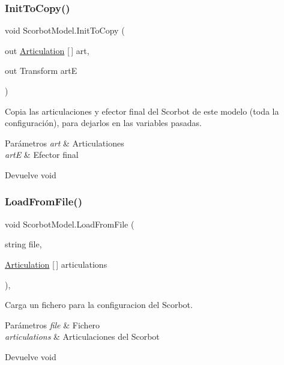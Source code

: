 \subsubsection{\texorpdfstring{InitToCopy()}{InitToCopy()}}
{\footnotesize\ttfamily void Scorbot\+Model.\+Init\+To\+Copy (\begin{DoxyParamCaption}\item[{out \mbox{\hyperlink{class_articulation}{Articulation}} \mbox{[}$\,$\mbox{]}}]{art,  }\item[{out Transform}]{artE }\end{DoxyParamCaption})\hspace{0.3cm}{\ttfamily [inline]}}

Copia las articulaciones y efector final del Scorbot de este modelo (toda la configuración), para dejarlos en las variables pasadas. 
\begin{DoxyParams}{Parámetros}
{\em art} & Articulationes \\
\hline
{\em artE} & Efector final \\
\hline
\end{DoxyParams}
\begin{DoxyReturn}{Devuelve}
void 
\end{DoxyReturn}
\mbox{\label{class_scorbot_model_a35cbb52dd700f099d0f4d66b8516a69b}} 
\subsubsection{\texorpdfstring{LoadFromFile()}{LoadFromFile()}}
{\footnotesize\ttfamily void Scorbot\+Model.\+Load\+From\+File (\begin{DoxyParamCaption}\item[{string}]{file,  }\item[{\mbox{\hyperlink{class_articulation}{Articulation}} \mbox{[}$\,$\mbox{]}}]{articulations }\end{DoxyParamCaption})\hspace{0.3cm}{\ttfamily [inline]}, {\ttfamily [private]}}

Carga un fichero para la configuracion del Scorbot. 
\begin{DoxyParams}{Parámetros}
{\em file} & Fichero \\
\hline
{\em articulations} & Articulaciones del Scorbot \\
\hline
\end{DoxyParams}
\begin{DoxyReturn}{Devuelve}
void 
\end{DoxyReturn}
\mbox{\label{class_scorbot_model_aaac42c1b3077127fcacfc463750ddd02}} 
